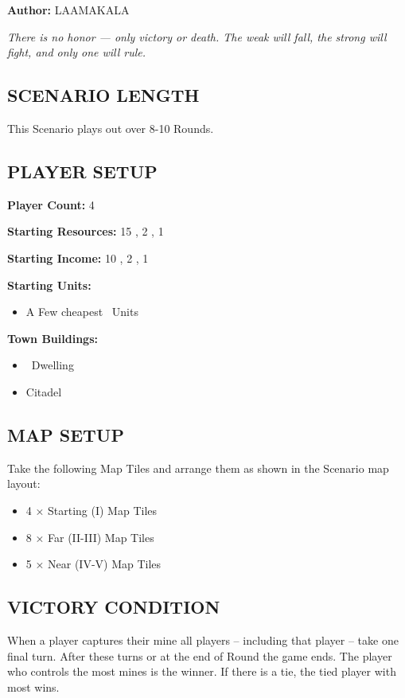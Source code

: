 
\begin{multicols*}{2}

\textbf{Author:} LAAMAKALA

\textit{There is no honor — only victory or death. The weak will fall, the strong will fight, and only one will rule.}

\subsection*{\MakeUppercase{Scenario Length}}
This Scenario plays out over 8-10 Rounds.

\subsection*{\MakeUppercase{Player Setup}}
\textbf{Player Count:} 4

\textbf{Starting Resources:} 15 , 2 , 1 

\textbf{Starting Income:} 10 , 2 , 1 

\textbf{Starting Units:}
\begin{itemize}
  \item A Few cheapest \silver\ Units
\end{itemize}

\textbf{Town Buildings:}
\begin{itemize}
  \item \bronze\ Dwelling
  \item Citadel
\end{itemize}

\subsection*{\MakeUppercase{Map Setup}}
Take the following Map Tiles and arrange them as shown in the Scenario map layout:

\begin{itemize}
  \item 4 × Starting (I) Map Tiles
  \item 8 × Far (II-III) Map Tiles
  \item 5 × Near (IV-V) Map Tiles
\end{itemize}

\subsection*{\MakeUppercase{Victory Condition}}
When a player captures their  mine all players -- including that player -- take one final turn. After these turns or at the end of  Round the game ends. The player who controls the most mines is the winner. If there is a tie, the tied player with most  wins.


\end{multicols*}
